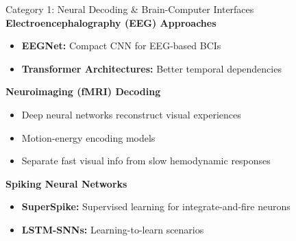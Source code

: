 \documentclass[aspectratio=169]{beamer}
\begin{document}
\begin{frame}{Category 1: Neural Decoding \& Brain-Computer Interfaces}
  \textbf{Electroencephalography (EEG) Approaches}
  \begin{itemize}
    \item \textbf{EEGNet:} Compact CNN for EEG-based BCIs \cite{lawhernEEGNetCompactConvolutional2018}
    \item \textbf{Transformer Architectures:} Better temporal dependencies
  \end{itemize}
  
  \vspace{0.5em}
  
  \textbf{Neuroimaging (fMRI) Decoding}
  \begin{itemize}
    \item Deep neural networks reconstruct visual experiences \cite{mathisDecodingBrainNeural2024}
    \item Motion-energy encoding models
    \item Separate fast visual info from slow hemodynamic responses
  \end{itemize}
  
  \vspace{0.5em}
  
  \textbf{Spiking Neural Networks}
  \begin{itemize}
    \item \textbf{SuperSpike:} Supervised learning for integrate-and-fire neurons \cite{zenkeSuperSpikeSupervisedLearning2018}
    \item \textbf{LSTM-SNNs:} Learning-to-learn scenarios \cite{bellecLongShorttermMemory2018}
  \end{itemize}
\end{frame}
\end{document}
